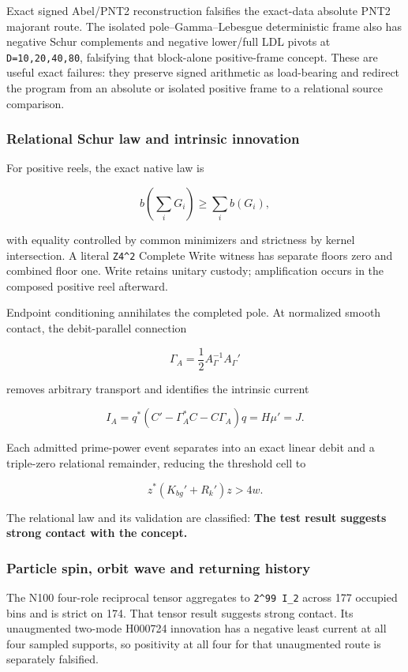 Exact signed Abel/PNT2 reconstruction falsifies the exact-data absolute
PNT2 majorant route. The isolated pole--Gamma--Lebesgue deterministic
frame also has negative Schur complements and negative lower/full LDL
pivots at \texttt{D=10,20,40,80}, falsifying that block-alone
positive-frame concept. These are useful exact failures: they preserve
signed arithmetic as load-bearing and redirect the program from an
absolute or isolated positive frame to a relational source comparison.

\subsubsection{Relational Schur law and intrinsic
innovation}\label{viii-ch09-relational-schur-law-and-intrinsic-innovation}

For positive reels, the exact native law is

\[
b\!\left(\sum_iG_i\right)\geq\sum_i b(G_i),
\]

with equality controlled by common minimizers and strictness by kernel
intersection. A literal \texttt{Z4\^{}2} Complete Write witness has
separate floors zero and combined floor one. Write retains unitary
custody; amplification occurs in the composed positive reel afterward.

Endpoint conditioning annihilates the completed pole. At normalized
smooth contact, the debit-parallel connection

\[
\Gamma_A=\frac12A_\Gamma^{-1}A_\Gamma'
\]

removes arbitrary transport and identifies the intrinsic current

\[
I_A=q^*(C'-\Gamma_A^*C-C\Gamma_A)q=H\mu'=J.
\]

Each admitted prime-power event separates into an exact linear debit and
a triple-zero relational remainder, reducing the threshold cell to

\[
z^*(K_{bg}'+R_k')z>4w.
\]

The relational law and its validation are classified: \textbf{The test
result suggests strong contact with the concept.}

\subsubsection{Particle spin, orbit wave and returning
history}\label{viii-ch09-particle-spin-orbit-wave-and-returning-history}

The N100 four-role reciprocal tensor aggregates to
\texttt{2\^{}99\ I\_2} across 177 occupied bins and is strict on 174.
That tensor result suggests strong contact. Its unaugmented two-mode
H000724 innovation has a negative least current at all four sampled
supports, so positivity at all four for that unaugmented route is
separately falsified.

